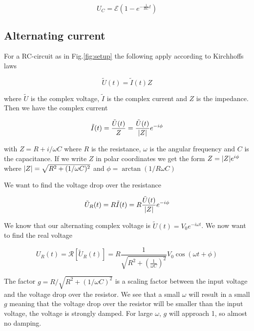 \documentclass[../main/main.tex]{subfiles}
\begin{document}
\begin{equation}
  U_C = \mathcal{E} \left( 1 - e^{- \frac{1}{RC} t} \right)
\end{equation}

\subsection{Alternating current}

For a RC-circuit as in Fig.\ref{fig:setup} the following apply according to Kirchhoffs laws

\begin{equation}
	\tilde{U}(t) = \tilde{I}(t)Z
\end{equation}

where \( \tilde{U} \) is the complex voltage, \( \tilde{I} \) is the complex current and \( Z \) is the impedance. Then we have the complex current

\begin{equation}
	\tilde{I}(t) = \frac{\tilde{U}(t)}{Z} = \frac{\tilde{U}(t)}{ \abs{Z}} e^{-i \phi}
\end{equation}

with \( Z = R + i/ \omega C \) where \( R \) is the resistance, \(\omega \) is the angular frequency and \( C \) is the capacitance.
If we write \( Z \) in polar coordinates we get the form \( Z = \abs{Z} e^{i \phi} \) where \( \abs{Z} = \sqrt{R^2 + (1/\omega C)^2} \) and \( \phi = \arctan(1 / R \omega C ) \)

We want to find the voltage drop over the resistance

\begin{equation}
	\tilde{U}_R(t) = R \tilde{I}(t) = R \frac{\tilde{U}(t)}{ \abs{Z}} e^{-i \phi}
\end{equation}

We know that our alternating complex voltage is \( \tilde{U}(t) = V_0 e^{-i \omega t } \).
We now want to find the real voltage

\begin{equation}
	U_R(t) = \mathcal{R}[\tilde{U}_R(t)] = R \frac{1}{ \sqrt{R^2 + \left( \frac{1}{ \omega C } \right)^2 } } V_0 \cos ( \omega t + \phi)
\end{equation}

The factor \( g = R / \sqrt{R^2 + ( 1 / \omega C )^2} \) is a scaling factor between the input voltage and the voltage drop over the resistor.
We see that a small \( \omega \) will result in a small \( g \) meaning that the voltage drop over the resistor will be smaller than the input voltage, the voltage is strongly damped.
For large \( \omega \), \( g \) will approach 1, so almost no damping.
\end{document}
